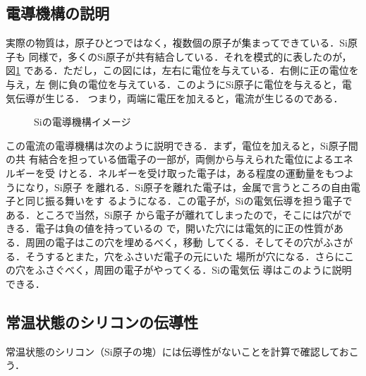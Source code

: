         \subsection{電導機構の説明}
            実際の物質は，原子ひとつではなく，複数個の原子が集まってできている．Si原子も
            同様で，多くのSi原子が共有結合している．それを模式的に表したのが，図\ref{fig:SiDendou}
            である．ただし，この図には，左右に電位を与えている．右側に正の電位を与え，左
            側に負の電位を与えている．このようにSi原子に電位を与えると，電気伝導が生じる．
            つまり，両端に電圧を加えると，電流が生じるのである．
                            \begin{figure}[htbp]
                                \begin{center}
                                    \caption{Siの電導機構イメージ}
                                    \label{fig:SiDendou}
                                \end{center}
                            \end{figure}

            この電流の電導機構は次のように説明できる．まず，電位を加えると，Si原子間の共
            有結合を担っている価電子の一部が，両側から与えられた電位によるエネルギーを受
            けとる．ネルギーを受け取った電子は，ある程度の運動量をもつようになり，Si原子
            を離れる．Si原子を離れた電子は，金属で言うところの自由電子と同じ振る舞いをす
            るようになる．この電子が，Siの電気伝導を担う電子である．ところで当然，Si原子
            から電子が離れてしまったので，そこには穴ができる．電子は負の値を持っているの
            で，開いた穴には電気的に正の性質がある．周囲の電子はこの穴を埋めるべく，移動
            してくる．そしてその穴がふさがる．そうするとまた，穴をふさいだ電子の元にいた
            場所が穴になる．さらにこの穴をふさぐべく，周囲の電子がやってくる．Siの電気伝
            導はこのように説明できる．

        \subsection{常温状態のシリコンの伝導性}
            常温状態のシリコン（Si原子の塊）には伝導性がないことを計算で確認しておこう．

